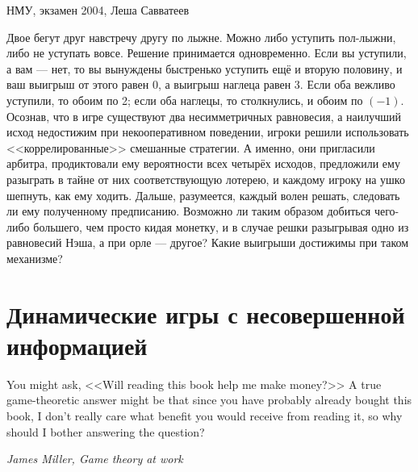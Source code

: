 \begin{problem}[Лыжники-2]
\begin{source}
НМУ, экзамен 2004, Леша Савватеев
\end{source} Двое бегут друг навстречу другу по лыжне. Можно либо уступить пол-лыжни, либо не уступать вовсе. Решение принимается одновременно. Если вы уступили, а вам --- нет, то вы вынуждены
быстренько уступить ещё и вторую половину, и ваш выигрыш от этого равен 0, а выигрыш наглеца равен 3. Если оба вежливо уступили, то обоим по 2; если оба наглецы, то столкнулись, и обоим по $(-1)$.
Осознав, что в игре существуют два несимметричных равновесия, а наилучший исход недостижим при некооперативном поведении, игроки решили использовать <<коррелированные>> смешанные стратегии. А именно, они пригласили арбитра, продиктовали ему вероятности всех четырёх исходов, предложили ему разыграть в тайне от них соответствующую лотерею, и каждому игроку на ушко шепнуть, как ему ходить. Дальше, разумеется, каждый волен решать, следовать ли ему полученному предписанию.
Возможно ли таким образом добиться чего-либо большего, чем просто кидая монетку, и в случае решки разыгрывая одно из равновесий Нэша, а при орле --- другое? Какие выигрыши достижимы при таком механизме?
\begin{sol}

\end{sol}
\end{problem}






\section{Динамические игры с несовершенной информацией}
%
\begin{rem}
You might ask, <<Will reading this book help me make money?>> A true game-theoretic answer might be that since you have probably already bought this book, I don't really care what benefit you would receive from reading it, so why should I bother answering the question?

{\it James Miller, Game theory at work \cite{miller:gtw}}
\end{rem}


